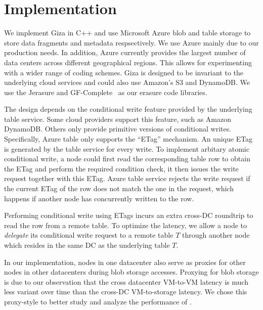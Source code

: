 \section{Implementation}
We implement Giza in C++ and use Microsoft Azure blob and table storage to store data fragments and metadata respsectively. We use Azure mainly 
due to our production needs. In addition, Azure currently provides the largest number 
of data centers across different geographical regions. This allows for experimenting 
with a wider range of coding schemes. Giza is designed to be invariant to the 
underlying cloud services and could also use Amazon's S3 and DynamoDB. 
We use the Jerasure and GF-Complete~\cite{Jerasure} as our erasure code libraries.

The \name design depends on the conditional write feature provided by the underlying 
table service. Some cloud providers support this feature, such as Amazon DynamoDB.
Others only provide primitive versions of conditional writes. Specifically, 
Azure table only supports the ``ETag'' mechanism. An unique ETag 
is generated by the table service for every write.  To implement arbitary atomic
conditional write, a \name node could first read the corresponding table row to
obtain the ETag and perform the required condition check, it then issues the
write request together with this ETag.  Azure table service rejects the
write request if the current ETag of the row does not match the one in the
request, which happens if another \name node has concurrently written to the row.  

Performing conditional write using ETags 
incurs an extra cross-DC roundtrip to read the row from a remote table.
To optimize the latency, we allow a \name node to \emph{delegate} its 
conditional write request to a remote table $T$ through another node which
resides in the same DC as the underlying table $T$.  

In our implementation, \name nodes in one datacenter also serve as proxies for
other nodes in other datacenters during blob storage accesses.  Proxying for
blob storage is due to our observation that the cross datacenter VM-to-VM
latency is much less variant over time than the cross-DC VM-to-storage latency.
We chose this proxy-style to better study and analyze the performance of \name.

